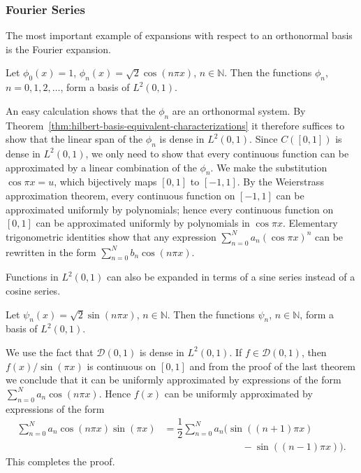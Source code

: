 \subsubsection{Fourier Series}\label{subsec:fourier-series-hilbert-bases}

The most important example of expansions with respect to an orthonormal basis is the Fourier expansion.

\begin{Theorem}
\label{thm:fourier-cosine-hilbert-basis}
Let $\phi_0(x)=1$, $\phi_n(x)=\sqrt2\cos(n\pi x)$, $n\in\mathbb{N}$. Then the functions $\phi_n$, $n=0,1,2,\ldots$, form a basis of $L^2(0,1)$.
\end{Theorem}

\begin{Proof}
An easy calculation shows that the $\phi_n$ are an orthonormal system. By Theorem~\ref{thm:hilbert-basis-equivalent-characterizations} it therefore suffices to show that the linear span of the $\phi_n$ is dense in $L^2(0,1)$. Since $C([0,1])$ is dense in $L^2(0,1)$, we only need to show that every continuous function can be approximated by a linear combination of the $\phi_n$. We make the substitution $\cos\pi x=u$, which bijectively maps $[0,1]$ to $[-1,1]$. By the Weierstrass approximation theorem, every continuous function on $[-1,1]$ can be approximated uniformly by polynomials; hence every continuous function on $[0,1]$ can be approximated uniformly by polynomials in $\cos\pi x$. Elementary trigonometric identities show that any expression $\sum_{n=0}^N a_n(\cos\pi x)^n$ can be rewritten in the form $\sum_{n=0}^N b_n\cos(n\pi x)$.
\end{Proof}

Functions in $L^2(0,1)$ can also be expanded in terms of a sine series instead of a cosine series.

\begin{Theorem}
\label{thm:fourier-sine-hilbert-basis}
Let $\psi_n(x)=\sqrt2\sin(n\pi x)$, $n\in\mathbb{N}$. Then the functions $\psi_n$, $n\in\mathbb{N}$, form a basis of $L^2(0,1)$.
\end{Theorem}

\begin{Proof}
We use the fact that $\mathcal{D}(0,1)$ is dense in $L^2(0,1)$. If $f\in\mathcal{D}(0,1)$, then $f(x)/\sin(\pi x)$ is continuous on $[0,1]$ and from the proof of the last theorem we conclude that it can be uniformly approximated by expressions of the form $\sum_{n=0}^N a_n\cos(n\pi x)$. Hence $f(x)$ can be uniformly approximated by expressions of the form
\begin{equation}\label{eq:fourier-sine-cosine-product-identity}
\begin{aligned}
\sum_{n=0}^N a_n\cos(n\pi x)\sin(\pi x)
&=\dfrac12\sum_{n=0}^N a_n\bigl(\sin((n+1)\pi x)\\
&\hspace{8em}-\sin((n-1)\pi x)\bigr).
\end{aligned}
\end{equation}
This completes the proof.
\end{Proof}

